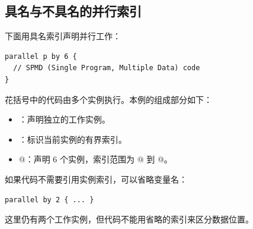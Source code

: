 \subsection*{具名与不具名的并行索引}

下面用具名索引声明并行工作：

\begin{lstlisting}[language=croqtile,caption={具名的并行索引}]
parallel p by 6 {
  // SPMD (Single Program, Multiple Data) code
}
\end{lstlisting}

花括号中的代码由多个实例执行。本例的组成部分如下：

\begin{itemize}[leftmargin=1.6em]
\item \co@parallel@：声明独立的工作实例。
\item \co@p@：标识当前实例的有界索引。
\item {}@：声明 6 个实例，索引范围为 @ 到 @。
\end{itemize}

如果代码不需要引用实例索引，可以省略变量名：

\begin{lstlisting}[language=croqtile,caption={不具名的并行索引}]
parallel by 2 { ... }
\end{lstlisting}

这里仍有两个工作实例，但代码不能用省略的索引来区分数据位置。

